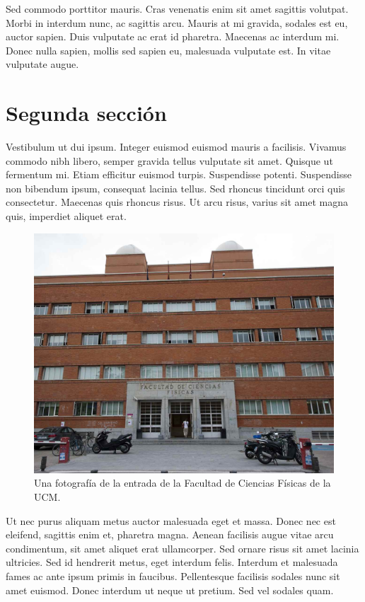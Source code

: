 \documentclass[a4paper]{article}
\begin{document}
Sed commodo porttitor mauris. Cras venenatis enim sit amet sagittis volutpat. Morbi in interdum nunc, ac sagittis arcu. Mauris at mi gravida, sodales est eu, auctor sapien. Duis vulputate ac erat id pharetra. Maecenas ac interdum mi. Donec nulla sapien, mollis sed sapien eu, malesuada vulputate est. In vitae vulputate augue.



\section{Segunda sección}


Vestibulum ut dui ipsum. Integer euismod euismod mauris a facilisis. Vivamus commodo nibh libero, semper gravida tellus vulputate sit amet. Quisque ut fermentum mi. Etiam efficitur euismod turpis. Suspendisse potenti. Suspendisse non bibendum ipsum, consequat lacinia tellus. Sed rhoncus tincidunt orci quis consectetur. Maecenas quis rhoncus risus. Ut arcu risus, varius sit amet magna quis, imperdiet aliquet erat.


\begin{figure}[H]
	\centering
	\includegraphics[scale=.3]{img/imagen}	%
	\caption{Una fotografía de la entrada de la Facultad de Ciencias Físicas de la UCM.}
	\label{fig:patio}
\end{figure}



Ut nec purus aliquam metus auctor malesuada eget et massa. Donec nec est eleifend, sagittis enim et, pharetra magna. Aenean facilisis augue vitae arcu condimentum, sit amet aliquet erat ullamcorper. Sed ornare risus sit amet lacinia ultricies. Sed id hendrerit metus, eget interdum felis. Interdum et malesuada fames ac ante ipsum primis in faucibus. Pellentesque facilisis sodales nunc sit amet euismod. Donec interdum ut neque ut pretium. Sed vel sodales quam.
\end{document}
